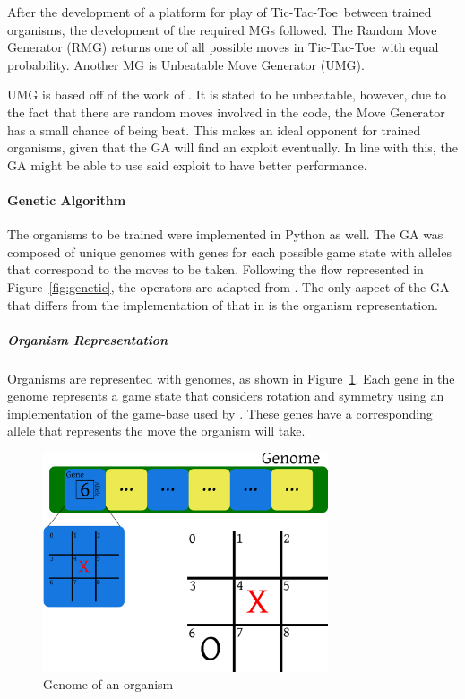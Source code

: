 \documentclass{strrespaper-trad}
\newcommand{\ttt}{Tic-Tac-Toe}
\begin{document}
				After the development of a platform for play of \ttt\ between trained organisms, the development of the required MGs followed.
				The Random Move Generator (RMG) returns one of all possible moves in \ttt\ with equal probability.
				Another MG is Unbeatable Move Generator (UMG).

				UMG is based off of the work of \textcite{barratRobbiebarratUnbeatableTictactoe2019}.
				It is stated to be unbeatable, however, due to the fact that there are random moves involved in the code, the Move Generator has a small chance of being beat.
				This makes an ideal opponent for trained organisms, given that the GA will find an exploit eventually.
				In line with this, the GA might be able to use said exploit to have better performance.

				\paragraph{Genetic Algorithm}
					The organisms to be trained were implemented in Python as well.
					The GA was composed of unique genomes with genes for each possible game state with alleles that correspond to the moves to be taken.
					Following the flow represented in Figure~\ref{fig:genetic}, the operators are adapted from \textcite{bhattSearchNolossStrategies2008}.
					The only aspect of the GA that differs from the implementation of that in \textcite{bhattSearchNolossStrategies2008} is the organism representation.
					\subparagraph{Organism Representation}
						Organisms are represented with genomes, as shown in Figure~\ref{fig:genome}.
						Each gene in the genome represents a game state that considers rotation and symmetry using an implementation of the game-base used by \textcite{bhattSearchNolossStrategies2008}.
						These genes have a corresponding allele that represents the move the organism will take.
						\begin{figure}[htbp]
							\centering
							\includegraphics[width=0.75\textwidth]{representation}
							\caption{Genome of an organism}
							\label{fig:genome}
						\end{figure}
\end{document}
